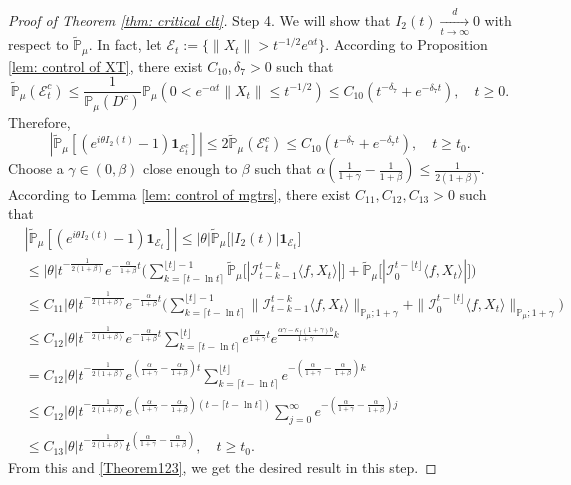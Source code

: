 \documentclass[12pt,a4paper]{amsart}
\theoremstyle{plain}
\theoremstyle{definition}
\numberwithin{equation}{section}
\begin{document}
\begin{proof}[Proof of Theorem \ref{thm: critical clt}]
  Step 4.
  We will show that $I_2(t) \xrightarrow[t\to \infty]{d} 0$ with respect to $\mathbb{\widetilde{P}}_{\mu}$.
  In fact, let $\mathcal{E}_t:=\{\|X_t\|>t^{-1/2}e^{\alpha t}\}$. According to Proposition \ref{lem: control of XT}, there exist $C_{10}, \delta_7>0$ such that
  \begin{equation}
    \mathbb{\widetilde{P}}_{\mu}(\mathcal{E}^c_t)
    \leq \frac{1}{\mathbb{P}_{\mu}(D^c)}\mathbb{P}_{\mu}(0<e^{-\alpha t}\|X_t\|\leq t^{-1/2})\leq C_{10}( t^{-\delta_7}+e^{-\delta_7 t})
    , \quad t\geq0.
  \end{equation}
  Therefore,
  \begin{equation}
    \label{Theorem123}
    |\mathbb{\widetilde{P}}_{\mu}[(e^{i\theta I_2(t)}-1)\mathbf{1}_{\mathcal{E}^c_t}]|
    \leq 2\mathbb{\widetilde{P}}_{\mu}(\mathcal{E}^c_t)\leq C_{10}(t^{-\delta_7}+e^{-\delta_7 t}),
    \quad t\geq t_0.
  \end{equation}
  Choose a $\gamma\in (0,\beta)$ close enough to $\beta$ such that $\alpha(\frac{1}{1+\gamma}-\frac{1}{1+\beta})\leq \frac{1}{2(1+\beta)}$.
	According to Lemma \ref{lem: control of mgtrs}, there exist $C_{11},C_{12},C_{13}>0$ such that
  \begin{align}
    & |\mathbb{\widetilde{P}}_{\mu} [ (e^{i\theta I_2(t)}-1)\mathbf{1}_{\mathcal{E}_t}]|
      \leq |\theta| \mathbb{\widetilde{P}}_{\mu} \big[ |I_2(t)|\mathbf{1}_{\mathcal{E}_t}\big] \\
    & \leq | \theta| t^{-\frac{1}{2(1+\beta)}}e^{-\frac{\alpha}{1+\beta}t}\Big(\sum_{k=\lceil t-\ln t \rceil}^{\lfloor t \rfloor - 1}\mathbb{\widetilde{P}}_{\mu}\big[| \mathcal{I}_{t-k-1}^{t-k}\langle f,X_t\rangle|\big] + \mathbb{\widetilde{P}}_{\mu}\big[| \mathcal{I}_{0}^{t-\lfloor t\rfloor}\langle f,X_t\rangle|\big]\Big) \\
    & \leq C_{11} |\theta| t^{-\frac{1}{2(1+\beta)}}e^{-\frac{\alpha}{1+\beta}t}\Big(\sum_{k=\lceil t-\ln t \rceil}^{\lfloor t \rfloor - 1}\|\mathcal{I}_{t-k-1}^{t-k}\langle f,X_t\rangle\|_{\mathbb P_\mu; 1+\gamma} + \|\mathcal I_0^{t-\lfloor t \rfloor} \langle f, X_t\rangle\|_{\mathbb P_\mu;1+\gamma}\Big) \\ 
    & \leq C_{12} |\theta| t^{-\frac{1}{2(1+\beta)}}e^{-\frac{\alpha}{1+\beta}t}\sum_{k=\lceil t-\ln t \rceil}^{\lfloor t \rfloor}e^{\frac{\alpha}{1+\gamma}t}e^{\frac{\alpha\gamma-\kappa_f(1+\gamma)b}{1+\gamma}k}\\ 
    & = C_{12} |\theta| t^{-\frac{1}{2(1+\beta)}}e^{(\frac{\alpha }{1+\gamma}-\frac{\alpha }{1+\beta})t} \sum_{k=\lceil t-\ln t \rceil}^{\lfloor t \rfloor}e^{-(\frac{\alpha}{1+\gamma}-\frac{\alpha}{1+\beta})k}\\
    & \leq C_{12} |\theta| t^{-\frac{1}{2(1+\beta)}}e^{(\frac{\alpha }{1+\gamma}-\frac{\alpha }{1+\beta})(t - \lceil t - \ln t\rceil)} \sum_{j=0}^{\infty}e^{-(\frac{\alpha}{1+\gamma}-\frac{\alpha}{1+\beta})j}\\
    & \leq C_{13}|\theta| t^{-\frac{1}{2(1+\beta)}}t^{(\frac{\alpha}{1+\gamma}- \frac{\alpha}{1+\beta})},
      \quad t\geq t_0.
  \end{align}
  From this and \eqref{Theorem123}, we get the desired result in this step.
  

\end{proof}
\end{document}
